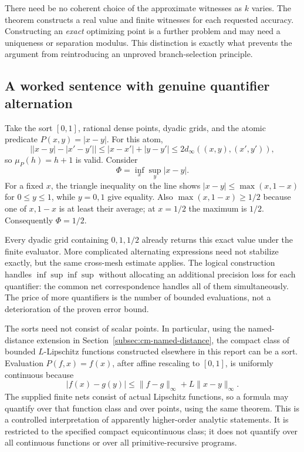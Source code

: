 There need be no coherent choice of the approximate witnesses as $k$
varies. The theorem constructs a real value and finite witnesses for
each requested accuracy. Constructing an \emph{exact} optimizing point
is a further problem and may need a uniqueness or separation modulus.
This distinction is exactly what prevents the argument from
reintroducing an unproved branch-selection principle.

\subsection{A worked sentence with genuine quantifier alternation}

Take the sort $[0,1]$, rational dense points, dyadic grids, and the
atomic predicate $P(x,y)=|x-y|$. For this atom,
\[
 \bigl||x-y|-|x'-y'|\bigr|
 \leq |x-x'|+|y-y'|
 \leq2d_\infty((x,y),(x',y')),
\]
so $\mu_P(h)=h+1$ is valid. Consider
\begin{equation}
 \Phi=\inf_x\sup_y |x-y|.
 \label{eq:cm-radius-sentence}
\end{equation}
For a fixed $x$, the triangle inequality on the line shows
$|x-y|\leq\max(x,1-x)$ for $0\leq y\leq1$, while $y=0,1$
give equality. Also $\max(x,1-x)\geq1/2$ because one of $x,1-x$
is at least their average; at $x=1/2$ the maximum is $1/2$.
Consequently $\Phi=1/2$.

Every dyadic grid containing $0,1,1/2$ already returns this exact value
under the finite evaluator. More complicated alternating expressions
need not stabilize exactly, but the same cross-mesh estimate applies.
The logical construction handles $\inf\sup\inf\sup$ without allocating
an additional precision loss for each quantifier: the common net
correspondence handles all of them simultaneously. The price of more
quantifiers is the number of bounded evaluations, not a deterioration
of the proven error bound.

The sorts need not consist of scalar points. In particular, using
the named-distance extension in
Section~\ref{subsec:cm-named-distance}, the compact
class of bounded $L$-Lipschitz functions constructed elsewhere in this
report can be a sort. Evaluation $P(f,x)=f(x)$, after affine rescaling
to $[0,1]$, is uniformly continuous because
\[
 |f(x)-g(y)|\leq\|f-g\|_\infty+L\|x-y\|_\infty.
\]
The supplied finite nets consist of actual Lipschitz functions, so a
formula may quantify over that function class and over points, using
the same theorem. This is a controlled interpretation of apparently
higher-order analytic statements. It is restricted to the specified
compact equicontinuous class; it does not quantify over all continuous
functions or over all primitive-recursive programs.

